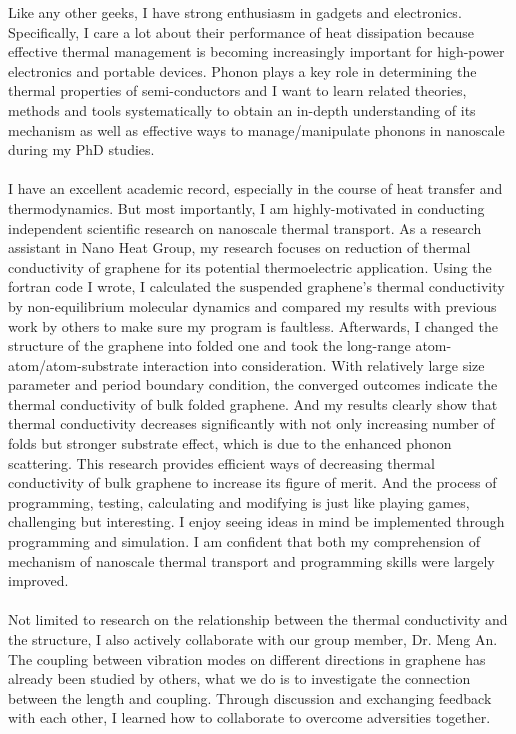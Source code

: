 \documentclass[a4paper,12pt]{article}
\begin{document}
\begin{spacing}{1.5}
\vspace{1.5em}
 Like any other geeks, I have strong enthusiasm in gadgets and electronics. Specifically, I care a lot about their performance of heat dissipation because effective thermal management is becoming increasingly important for high-power electronics and portable devices. Phonon plays a key role in determining the thermal properties of semi-conductors and I want to learn related theories, methods and tools systematically to obtain an in-depth understanding of its mechanism as well as effective ways to manage/manipulate phonons in nanoscale during my PhD studies. \\
\\
I have an excellent academic record, especially in the course of heat transfer and thermodynamics. But most importantly, I am highly-motivated in conducting independent scientific research on nanoscale thermal transport. As a research assistant in Nano Heat Group, my research focuses on reduction of thermal conductivity of graphene for its potential thermoelectric application. Using the fortran code I wrote, I calculated the suspended graphene’s thermal conductivity by non-equilibrium molecular dynamics and compared my results with previous work by others to make sure my program is faultless. Afterwards, I changed the structure of the graphene into folded one and took the long-range atom-atom/atom-substrate interaction into consideration. With relatively large size parameter and period boundary condition, the converged outcomes indicate the thermal conductivity of bulk folded graphene. And my results clearly show that thermal conductivity decreases significantly with not only increasing number of folds but stronger substrate effect, which is due to the enhanced phonon scattering. This research provides efficient ways of decreasing thermal conductivity of bulk graphene to increase its figure of merit. And the process of programming, testing, calculating and modifying is just like playing games, challenging but interesting. I enjoy seeing ideas in mind be implemented through programming and simulation. I am confident that both my comprehension of mechanism of nanoscale thermal transport and programming skills were largely improved.\\
\\
 Not limited to research on the relationship between the thermal conductivity and the structure, I also actively collaborate with our group member, Dr. Meng An. The coupling between vibration modes on different directions in graphene has already been studied by others, what we do is to investigate the connection between the length and coupling. Through discussion and exchanging feedback with each other, I learned how to collaborate to overcome adversities together.\\

\end{spacing}
\end{document}
